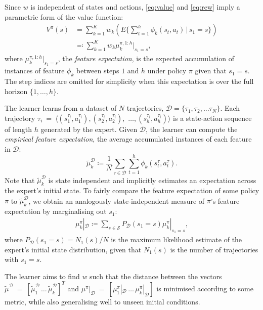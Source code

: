 \documentclass[a4paper,11pt]{report}
\begin{document}
Since $w$ is independent of states and actions, \eqref{eq:value} and \eqref{eq:rew} imply a parametric form of the value function:
\begin{align}
 	V^{\pi}(s) &= \sum^K_{k=1}w_k\left(E\{\sum_{t = 1}^h\phi_k(s_t,a_t)\,\vert\, s_1 = s\}\right)\\
&\eqqcolon\sum^K_{k=1}w_k\mu^{\pi, 1:h}_k|_{s_1=s},\label{eq:parametrized_value}
\end{align}
where $\mu^{\pi,1:h}_k|_{s_1=s}$, the \emph{feature expectation}, is the expected accumulation of instances of feature $\phi_k$ between steps $1$ and $h$ under policy $\pi$  given that $s_1 = s$. The step indices are omitted for simplicity when this expectation is over the full horizon $\{1,\ldots,h\}$.

The learner learns from a dataset of $N$ trajectories, $\mathcal{D} = \big\{ \tau_1,\tau_2,...\tau_N \big\}$. Each trajectory $\tau_i~=~\langle(s^{\tau_i}_1,a^{\tau_i}_1),(s^{\tau_i}_2,a^{\tau_i}_2),$ $\ldots,(s^{\tau_i}_{h},a^{\tau_i}_{h})\rangle$ is a state-action sequence of length $h$ generated by the expert.
Given $\mathcal{D}$, the learner can compute the \emph{empirical feature expectation}, the average accumulated instances of each feature in $\mathcal{D}$:
\begin{equation}
	\widetilde{\mu}^{\mathcal{D}}_k \coloneqq\frac{1}{N}\sum_{\tau\in\mathcal{D}}\sum_{t=1}^{h}\phi_k(s^\tau_t,a^\tau_t). \label{eqn:empirical_fe}
\end{equation}
Note that $\widetilde{\mu}^{\mathcal{D}}_k$ is state independent and implicitly estimates an expectation across
the expert's initial state.  To fairly compare the feature expectation of some policy $\pi$ to $\widetilde{\mu}^{\mathcal{D}}_k$, we obtain an analogously state-independent measure of $\pi$'s feature expectation by marginalising out $s_1$:
\begin{align}
  \label{eq:feature_expectation_belief}
  \mu^{\pi}_k|_{\mathcal{D}} \coloneqq \sum_{s\in\mathcal{S}}P_{\mathcal{D}}(s_1 = s)\mu^{\pi}_k|_{s_1=s},
\end{align}
where $P_{\mathcal{D}}(s_1 = s)= N_1(s)/N$ is the maximum likelihood estimate of the expert's initial state distribution, given that $N_1(s)$ is the number of trajectories with $s_1 = s$.

The learner aims to find $w$ such that the distance between the vectors $\widetilde\mu^{\mathcal{D}}~=~[\widetilde\mu^{\mathcal{D}}_1\,\ldots\,\widetilde\mu^{\mathcal{D}}_k]^T$ and $\mu^{\pi}|_{\mathcal{D}}~=~[\mu^{\pi}_1|_{\mathcal{D}}\,\ldots\,\mu^{\pi}_k|_{\mathcal{D}}]$ is minimised according to some metric, while also generalising well to unseen initial conditions.
\end{document}
